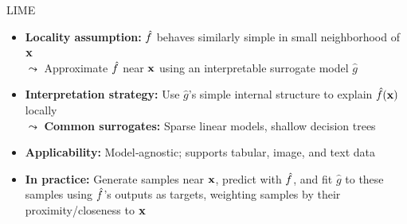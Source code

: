 \documentclass[10pt,compress,t,notes=noshow, xcolor=table]{beamer}
\newcommand{\gh}{\hat{g}}
\begin{document}
\begin{frame}[t]{LIME}
  \begin{itemize}%
    \item \textbf{Locality assumption:} $\hat{f}$ behaves similarly simple in small neighborhood of $\mathbf{x}$\\
    $\leadsto$ Approximate $\hat{f}$ near $\mathbf{x}$ using an interpretable surrogate model $\gh$
    \item \textbf{Interpretation strategy:} Use $\gh$'s simple internal structure to explain $\hat{f}(\mathbf{x})$ locally\\
    $\leadsto$ \textbf{Common surrogates:} Sparse linear models, shallow decision trees
    \item \textbf{Applicability:} Model‑agnostic; supports tabular, image, and text data %
    \item \textbf{In practice:} Generate samples near $\mathbf{x}$, predict with $\hat{f}$, and fit $\gh$ to these samples using $\hat{f}$’s outputs as targets, weighting samples by their proximity/closeness to $\mathbf{x}$

  \end{itemize}
\end{frame}


\end{document}
